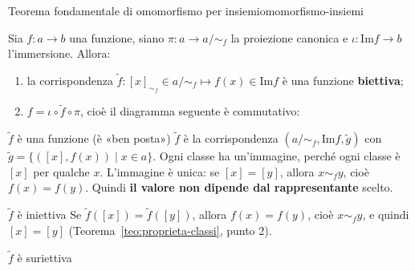 \begin{concetto}
\begin{Teorema}{Teorema fondamentale di omomorfismo per insiemi}{omomorfismo-insiemi}
    \begin{prerequisiti}
    \end{prerequisiti}
    Sia $f \colon a \to b$ una funzione, siano $\pi \colon a \to a/{\sim_f}$ la proiezione canonica e $\iota \colon \mathrm{Im} f \to b$
    l'immersione. Allora:
    \begin{enumerate}
        \item la corrispondenza $\tilde{f} \colon [x]_{\sim_f} \in a/{\sim_f} \mapsto f(x) \in \mathrm{Im} f$ è una funzione \textbf{biettiva};
        \item $f = \iota \circ \tilde{f} \circ \pi$, cioè il diagramma seguente è commutativo:
    \end{enumerate}
    \begin{center}
    \end{center}
\end{Teorema}
\begin{dimostrazione}
    \begin{caso}{$\tilde{f}$ è una funzione (è «ben posta»)}
        $\tilde{f}$ è la corrispondenza $(a/{\sim_f}, \mathrm{Im} f, \tilde{g})$ con $\tilde{g} = \{([x], f(x)) \mid x \in a\}$. Ogni classe
        ha un'immagine, perché ogni classe è $[x]$ per qualche $x$. L'immagine è unica: se $[x] = [y]$, allora $x \sim_f y$, cioè
        $f(x) = f(y)$. Quindi \textbf{il valore non dipende dal rappresentante} scelto.
    \end{caso}
    \begin{caso}{$\tilde{f}$ è iniettiva}
        Se $\tilde{f}([x]) = \tilde{f}([y])$, allora $f(x) = f(y)$, cioè $x \sim_f y$, e quindi $[x] = [y]$
        (Teorema~\ref{teo:proprieta-classi}, punto 2).
    \end{caso}
    \begin{caso}{$\tilde{f}$ è suriettiva}

\end{caso}
\end{dimostrazione}
\end{concetto}
